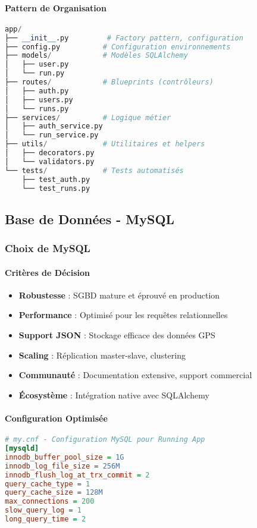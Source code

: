 \paragraph{Pattern de Organisation}
\begin{lstlisting}[language=python]
app/
├── __init__.py         # Factory pattern, configuration
├── config.py          # Configuration environnements
├── models/            # Modèles SQLAlchemy
│   ├── user.py
│   └── run.py
├── routes/            # Blueprints (contrôleurs)
│   ├── auth.py
│   ├── users.py
│   └── runs.py
├── services/          # Logique métier
│   ├── auth_service.py
│   └── run_service.py
├── utils/             # Utilitaires et helpers
│   ├── decorators.py
│   └── validators.py
└── tests/             # Tests automatisés
    ├── test_auth.py
    └── test_runs.py
\end{lstlisting}

\subsection{Base de Données - MySQL}

\subsubsection{Choix de MySQL}

\paragraph{Critères de Décision}
\begin{itemize}
    \item \textbf{Robustesse} : SGBD mature et éprouvé en production
    \item \textbf{Performance} : Optimisé pour les requêtes relationnelles
    \item \textbf{Support JSON} : Stockage efficace des données GPS
    \item \textbf{Scaling} : Réplication master-slave, clustering
    \item \textbf{Communauté} : Documentation extensive, support commercial
    \item \textbf{Écosystème} : Intégration native avec SQLAlchemy
\end{itemize}

\paragraph{Configuration Optimisée}
\begin{lstlisting}[language=ini]
# my.cnf - Configuration MySQL pour Running App
[mysqld]
innodb_buffer_pool_size = 1G
innodb_log_file_size = 256M
innodb_flush_log_at_trx_commit = 2
query_cache_type = 1
query_cache_size = 128M
max_connections = 200
slow_query_log = 1
long_query_time = 2
\end{lstlisting}

